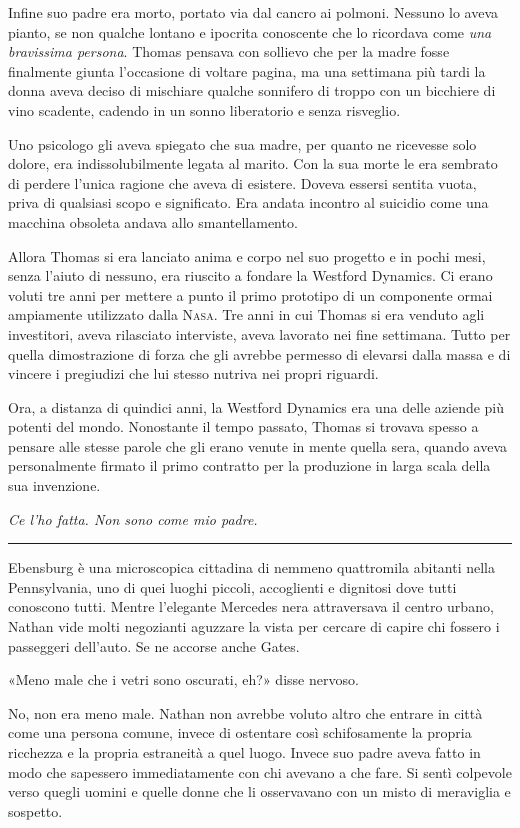 \documentclass[a4paper,oneside,11pt]{memoir}
\begin{document}
Infine suo padre era morto, portato via dal cancro ai polmoni. Nessuno lo aveva
pianto, se non qualche lontano e ipocrita conoscente che lo ricordava come
\emph{una bravissima persona}. Thomas pensava con sollievo che per la madre
fosse finalmente giunta l'occasione di voltare pagina, ma una settimana più
tardi la donna aveva deciso di mischiare qualche sonnifero di troppo con un
bicchiere di vino scadente, cadendo in un sonno liberatorio e senza risveglio.

Uno psicologo gli aveva spiegato che sua madre, per quanto ne ricevesse solo
dolore, era indissolubilmente legata al marito. Con la sua morte le era sembrato
di perdere l'unica ragione che aveva di esistere. Doveva essersi sentita vuota,
priva di qualsiasi scopo e significato. Era andata incontro al suicidio come una
macchina obsoleta andava allo smantellamento.

Allora Thomas si era lanciato anima e corpo nel suo progetto e in pochi mesi,
senza l'aiuto di nessuno, era riuscito a fondare la Westford Dynamics. Ci erano
voluti tre anni per mettere a punto il primo prototipo di un componente ormai
ampiamente utilizzato dalla {\scshape Nasa}. Tre anni in cui Thomas si era
venduto agli investitori, aveva rilasciato interviste, aveva lavorato nei fine
settimana. Tutto per quella dimostrazione di forza che gli avrebbe permesso di
elevarsi dalla massa e di vincere i pregiudizi che lui stesso nutriva nei propri
riguardi.

Ora, a distanza di quindici anni, la Westford Dynamics era una delle aziende più
potenti del mondo. Nonostante il tempo passato, Thomas si trovava spesso a
pensare alle stesse parole che gli erano venute in mente quella sera, quando
aveva personalmente firmato il primo contratto per la produzione in larga scala
della sua invenzione.

\emph{Ce l'ho fatta. Non sono come mio padre.}

\plainbreak{1}

Ebensburg è una microscopica cittadina di nemmeno quattromila abitanti nella
Pennsylvania, uno di quei luoghi piccoli, accoglienti e dignitosi dove tutti
conoscono tutti. Mentre l'elegante Mercedes nera attraversava il centro urbano,
Nathan vide molti negozianti aguzzare la vista per cercare di capire chi fossero
i passeggeri dell'auto. Se ne accorse anche Gates.

«Meno male che i vetri sono oscurati, eh?» disse nervoso.

No, non era meno male. Nathan non avrebbe voluto altro che entrare in città come
una persona comune, invece di ostentare così schifosamente la propria ricchezza
e la propria estraneità a quel luogo. Invece suo padre aveva fatto in modo che
sapessero immediatamente con chi avevano a che fare. Si sentì colpevole verso
quegli uomini e quelle donne che li osservavano con un misto di meraviglia e
sospetto.
\end{document}
